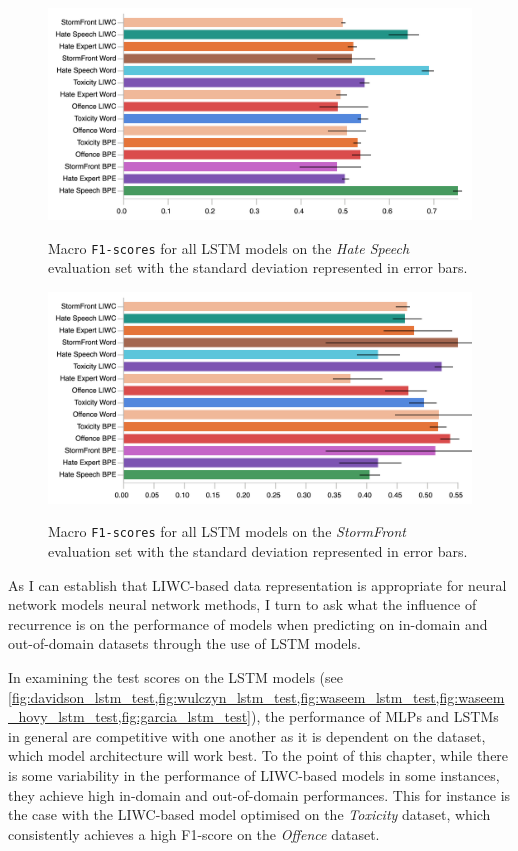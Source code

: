 \begin{figure}
\begin{minipage}{\textwidth}
    \centering
    \includegraphics[width=\textwidth]{all_lstm_waseem_hovy_test.pdf}
    \caption{Macro \texttt{F1-scores} for all LSTM models on the \textit{Hate Speech} evaluation set with the standard deviation represented in error bars.}
  \label{fig:waseem_hovy_lstm_test}  
  \vfill
    \includegraphics[width=\textwidth]{all_lstm_garcia_test.pdf}
  \caption{Macro \texttt{F1-scores} for all LSTM models on the \textit{StormFront} evaluation set with the standard deviation represented in error bars.}
  \label{fig:garcia_lstm_test}
\end{minipage}
\end{figure}

As I can establish that LIWC-based data representation is appropriate for neural network models neural network methods, I turn to ask what the influence of recurrence is on the performance of models when predicting on in-domain and out-of-domain datasets through the use of LSTM models.

In examining the test scores on the LSTM models (see \cref{fig:davidson_lstm_test,fig:wulczyn_lstm_test,fig:waseem_lstm_test,fig:waseem_hovy_lstm_test,fig:garcia_lstm_test}), the performance of MLPs and LSTMs in general are competitive with one another as it is dependent on the dataset, which model architecture will work best.
To the point of this chapter, while there is some variability in the performance of LIWC-based models in some instances, they achieve high in-domain and out-of-domain performances. 
This for instance is the case with the LIWC-based model optimised on the \textit{Toxicity} dataset, which consistently achieves a high F1-score on the \textit{Offence} dataset.

